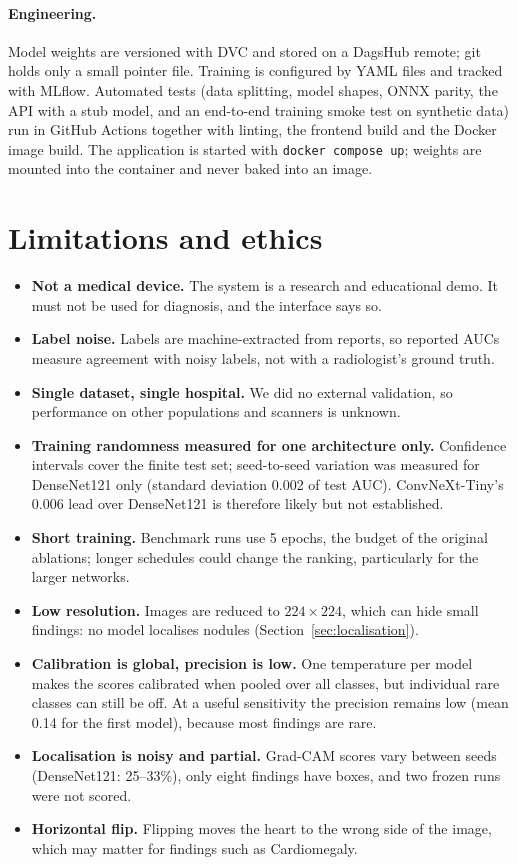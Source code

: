 \documentclass[11pt,a4paper]{article}
\begin{document}
\paragraph{Engineering.} Model weights are versioned with DVC and stored on a DagsHub remote; git holds only a small pointer file. Training is configured by YAML files and tracked with MLflow. Automated tests (data splitting, model shapes, ONNX parity, the API with a stub model, and an end-to-end training smoke test on synthetic data) run in GitHub Actions together with linting, the frontend build and the Docker image build. The application is started with \texttt{docker compose up}; weights are mounted into the container and never baked into an image.



\section{Limitations and ethics}
\begin{itemize}
  \item \textbf{Not a medical device.} The system is a research and educational demo. It must not be used for diagnosis, and the interface says so.
  \item \textbf{Label noise.} Labels are machine-extracted from reports, so reported AUCs measure agreement with noisy labels, not with a radiologist's ground truth.
  \item \textbf{Single dataset, single hospital.} We did no external validation, so performance on other populations and scanners is unknown.
  \item \textbf{Training randomness measured for one architecture only.} Confidence intervals cover the finite test set; seed-to-seed variation was measured for DenseNet121 only (standard deviation 0.002 of test AUC). ConvNeXt-Tiny's 0.006 lead over DenseNet121 is therefore likely but not established.
  \item \textbf{Short training.} Benchmark runs use 5 epochs, the budget of the original ablations; longer schedules could change the ranking, particularly for the larger networks.
  \item \textbf{Low resolution.} Images are reduced to $224\times224$, which can hide small findings: no model localises nodules (Section~\ref{sec:localisation}).
  \item \textbf{Calibration is global, precision is low.} One temperature per model makes the scores calibrated when pooled over all classes, but individual rare classes can still be off. At a useful sensitivity the precision remains low (mean 0.14 for the first model), because most findings are rare.
  \item \textbf{Localisation is noisy and partial.} Grad-CAM scores vary between seeds (DenseNet121: 25--33\%), only eight findings have boxes, and two frozen runs were not scored.
  \item \textbf{Horizontal flip.} Flipping moves the heart to the wrong side of the image, which may matter for findings such as Cardiomegaly.
\end{itemize}
\end{document}
